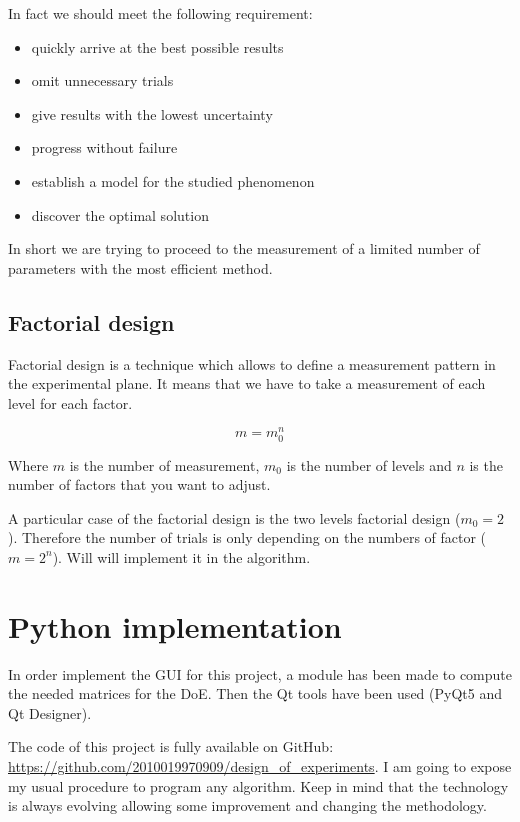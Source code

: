 \documentclass[english, 12 pt, openany, oneside]{book}
\begin{document}
In fact we should meet the following requirement:

\begin{itemize}
\item quickly arrive at the best possible results
\item omit unnecessary trials
\item give results with the lowest uncertainty
\item progress without failure
\item establish a model for the studied phenomenon
\item  discover the optimal solution
\end{itemize}

In short we are trying to proceed to the measurement of a limited number of parameters with the most efficient method.

\section{Factorial design}
Factorial design is a technique which allows to define a measurement pattern in the experimental plane. It means that we have to take a measurement of each level for each factor.

\begin{equation}
m = m_0^{n}
\end{equation}

Where $m$ is the number of measurement, $m_0$ is the number of levels and $n$ is the number of factors that you want to adjust.

A particular case of the factorial design is the two levels factorial design ($m_0 = 2$). Therefore the number of trials is only depending on the numbers of factor ($m = 2^n$). Will will implement it in the algorithm.


\chapter{Python implementation}
In order implement the GUI for this project, a module has been made to compute the needed matrices for the DoE. Then the Qt tools have been used (PyQt5 and Qt Designer).

The code of this project is fully available on GitHub: \url{https://github.com/2010019970909/design_of_experiments}. I am going to expose my usual procedure to program any algorithm. Keep in mind that the technology is always evolving allowing some improvement and changing the methodology.
\end{document}
